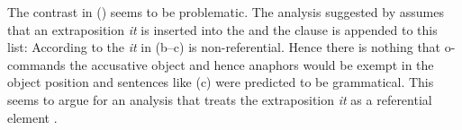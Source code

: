 \documentclass[output=paper
 	        ,biblatex
                ,babelshorthands
                ,newtxmath
                ,draftmode
                ,colorlinks, citecolor=brown
]{langscibook}
\begin{document}
The contrast in () seems to be problematic. The analysis suggested by \citet[]{ps2}
assumes that an extraposition \emph{it} is inserted into the \argstl and the clause is appended to
this list:
\eal
{}
\zl
According to \citet[]{ps2} the \emph{it} in (b--c) is non-referential. Hence there is
nothing that o-commands the accusative object and hence anaphors would be exempt in the object
position and sentences like (c) were predicted to be grammatical. This seems to argue for an
analysis that treats the extraposition \emph{it} as a referential element \citep[, 232]{Mueller99a}.






\end{document}
